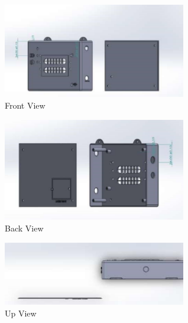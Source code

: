 \documentclass[twocolumn]{article}
\begin{document}
\begin{titlepage}
    \begin{figure}[h]
        \begin{minipage}{0.6\textwidth}
            \includegraphics[width=8cm]{18.png}
        \end{minipage}
        \hfill
        \begin{minipage}{0.35\textwidth}
            \caption{Front View}
            \label{fig:enter-label}
        \end{minipage}
        
    \end{figure}

    \begin{figure}[h]
        \begin{minipage}{0.6\textwidth}
            \includegraphics[width=8cm]{19.png}
        \end{minipage}
        \hfill
        \begin{minipage}{0.35\textwidth}
            \caption{Back View}
            \label{fig:enter-label}
        \end{minipage}
        
    \end{figure}    

    \begin{figure}[h]
        \begin{minipage}{0.6\textwidth}
            \includegraphics[width=8cm]{20.png}
        \end{minipage}
        \hfill
        \begin{minipage}{0.35\textwidth}
            \caption{Up View}
            \label{fig:enter-label}
        \end{minipage}
        

\end{figure}
\end{titlepage}
\end{document}
